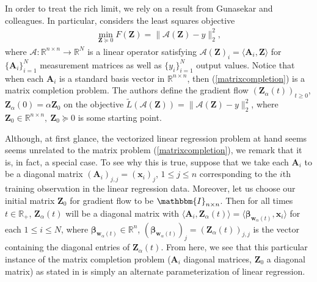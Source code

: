 \documentclass{article}
\begin{document}
In order to treat the rich limit, we rely on a result from Gunasekar and colleagues. In particular, \cite{gunasekar2018implicit} considers the least squares objective
\begin{align}\label{matrixcompletion}
    \min_{\boldsymbol{Z} \succeq 0} F(\boldsymbol{Z}) = \| \mathcal{A}(\boldsymbol{Z}) - y \|_2^2,
\end{align}
where $\mathcal{A}: \mathbb{R}^{n \times n} \rightarrow \mathbb{R}^N$ is a linear operator satisfying $\mathcal{A}(\boldsymbol{Z})_i = \langle \boldsymbol{A}_i, \boldsymbol{Z} \rangle$ for $\{ \boldsymbol{A}_i \}_{i=1}^N$ measurement matrices as well as $\{ y_i \}_{i=1}^N$ output values. Notice that when each $\boldsymbol{A}_i$ is a standard basis vector in $\mathbb{R}^{n \times n}$, then (\ref{matrixcompletion}) is a matrix completion problem. The authors define the gradient flow $(\boldsymbol{Z}_{\alpha}(t))_{t \geq 0}$, $\boldsymbol{Z}_{\alpha}(0) = \alpha \boldsymbol{Z}_0$ on the objective $\tilde{L}(\mathcal{A}(\boldsymbol{Z})) = \| \mathcal{A}(\boldsymbol{Z}) - y \|_2^2$, where $\boldsymbol{Z}_0 \in \mathbb{R}^{n \times n}, \ \boldsymbol{Z}_0 \succeq 0$ is some starting point. 

Although, at first glance, the vectorized linear regression problem at hand seems seems unrelated to the matrix problem (\ref{matrixcompletion}), we remark that it is, in fact, a special case. To see why this is true, suppose that we take each $\boldsymbol{A}_i$ to be a diagonal matrix $(\boldsymbol{A}_i)_{j,j} = (\boldsymbol{x}_i)_j$, $1 \leq j \leq n$ corresponding to the $i$th training observation in the linear regression data. Moreover, let us choose our initial matrix $\boldsymbol{Z}_0$ for gradient flow to be $\mathbbm{I}_{n \times n}$. Then for all times $t \in \mathbb{R}_+$, $\boldsymbol{Z}_{\alpha}(t)$ will be a diagonal matrix with $\langle \boldsymbol{A}_i, \boldsymbol{Z}_{\alpha}(t) \rangle = \langle \boldsymbol{\beta}_{\boldsymbol{w}_{\alpha}(t)},\boldsymbol{x}_i \rangle$ for each $1 \leq i \leq N$, where $\boldsymbol{\beta}_{\boldsymbol{w}_{\alpha}(t)} \in \mathbb{R}^n$, $(\boldsymbol{\beta}_{\boldsymbol{w}_{\alpha}(t)})_j = (\boldsymbol{Z}_{\alpha}(t))_{j,j}$ is the vector containing the diagonal entries of $\boldsymbol{Z}_{\alpha}(t)$. From here, we see that this particular instance of the matrix completion problem ($\boldsymbol{A}_i$ diagonal matrices, $\boldsymbol{Z}_0$ a diagonal matrix) as stated in \cite{gunasekar2018implicit} is simply an alternate parameterization of linear regression.
\end{document}
